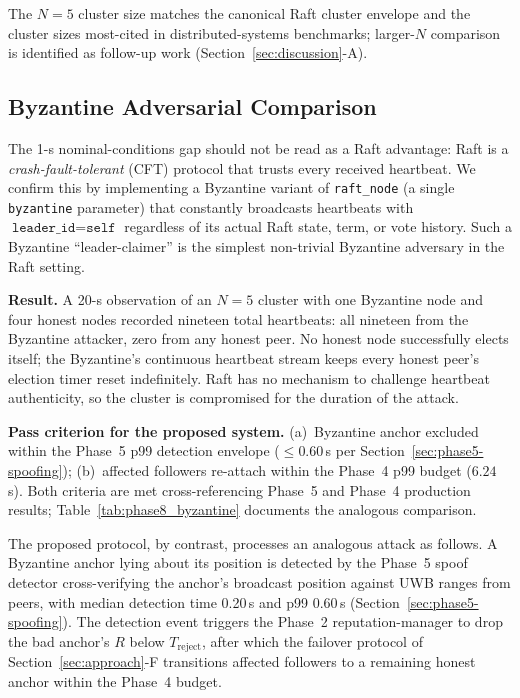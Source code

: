 \documentclass[journal,10pt,twocolumn]{IEEEtran}
\begin{document}
The $N{=}5$ cluster size matches the canonical Raft cluster envelope and the cluster sizes most-cited in distributed-systems benchmarks; larger-$N$ comparison is identified as follow-up work (Section~\ref{sec:discussion}-A).

\subsection{Byzantine Adversarial Comparison}

The 1-s nominal-conditions gap should not be read as a Raft advantage: Raft is a \emph{crash-fault-tolerant} (CFT) protocol that trusts every received heartbeat. We confirm this by implementing a Byzantine variant of \texttt{raft\_node} (a single \texttt{byzantine} parameter) that constantly broadcasts heartbeats with $\texttt{leader\_id}=\texttt{self}$ regardless of its actual Raft state, term, or vote history. Such a Byzantine ``leader-claimer'' is the simplest non-trivial Byzantine adversary in the Raft setting.

\textbf{Result.} A 20-s observation of an $N=5$ cluster with one Byzantine node and four honest nodes recorded nineteen total heartbeats: all nineteen from the Byzantine attacker, zero from any honest peer. No honest node successfully elects itself; the Byzantine's continuous heartbeat stream keeps every honest peer's election timer reset indefinitely. Raft has no mechanism to challenge heartbeat authenticity, so the cluster is compromised for the duration of the attack.

\textbf{Pass criterion for the proposed system.} (a)~Byzantine anchor excluded within the Phase~5 p99 detection envelope ($\leq 0.60$\,s per Section~\ref{sec:phase5-spoofing}); (b)~affected followers re-attach within the Phase~4 p99 budget ($6.24$\,s). Both criteria are met cross-referencing Phase~5 and Phase~4 production results; Table~\ref{tab:phase8_byzantine} documents the analogous comparison.

The proposed protocol, by contrast, processes an analogous attack as follows. A Byzantine anchor lying about its position is detected by the Phase~5 spoof detector cross-verifying the anchor's broadcast position against UWB ranges from peers, with median detection time 0.20\,s and p99 0.60\,s (Section~\ref{sec:phase5-spoofing}). The detection event triggers the Phase~2 reputation-manager to drop the bad anchor's $R$ below $T_\text{reject}$, after which the failover protocol of Section~\ref{sec:approach}-F transitions affected followers to a remaining honest anchor within the Phase~4 budget.
\end{document}
